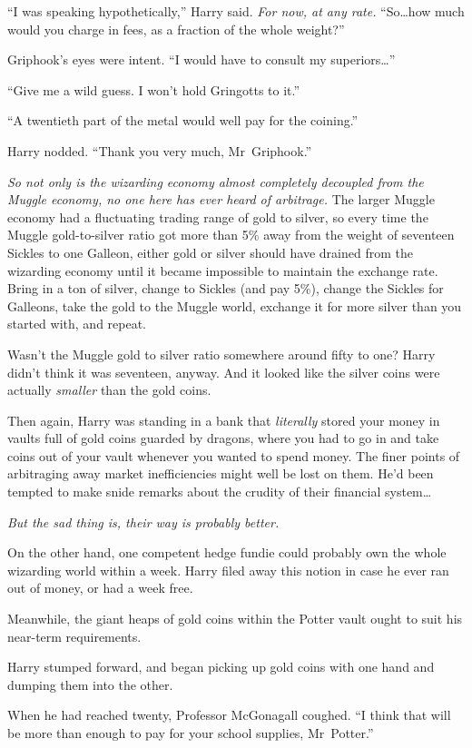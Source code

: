 “I was speaking hypothetically,” Harry said. \emph{For now, at any rate.} “So…how much would you charge in fees, as a fraction of the whole weight?”

Griphook’s eyes were intent. “I would have to consult my superiors…”

“Give me a wild guess. I won’t hold Gringotts to it.”

“A twentieth part of the metal would well pay for the coining.”

Harry nodded. “Thank you very much, Mr~Griphook.”

\emph{So not only is the wizarding economy almost completely decoupled from the Muggle economy, no one here has ever heard of arbitrage.} The larger Muggle economy had a fluctuating trading range of gold to silver, so every time the Muggle gold-to-silver ratio got more than 5\% away from the weight of seventeen Sickles to one Galleon, either gold or silver should have drained from the wizarding economy until it became impossible to maintain the exchange rate. Bring in a ton of silver, change to Sickles (and pay 5\%), change the Sickles for Galleons, take the gold to the Muggle world, exchange it for more silver than you started with, and repeat.

Wasn’t the Muggle gold to silver ratio somewhere around fifty to one? Harry didn’t think it was seventeen, anyway. And it looked like the silver coins were actually \emph{smaller} than the gold coins.

Then again, Harry was standing in a bank that \emph{literally} stored your money in vaults full of gold coins guarded by dragons, where you had to go in and take coins out of your vault whenever you wanted to spend money. The finer points of arbitraging away market inefficiencies might well be lost on them. He’d been tempted to make snide remarks about the crudity of their financial system…

\emph{But the sad thing is, their way is probably better.}

On the other hand, one competent hedge fundie could probably own the whole wizarding world within a week. Harry filed away this notion in case he ever ran out of money, or had a week free.

Meanwhile, the giant heaps of gold coins within the Potter vault ought to suit his near-term requirements.

Harry stumped forward, and began picking up gold coins with one hand and dumping them into the other.

When he had reached twenty, Professor McGonagall coughed. “I think that will be more than enough to pay for your school supplies, Mr~Potter.”

